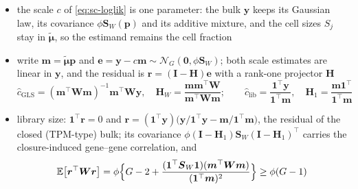 \begin{remark}
  \label{rem:scale-not-closure}
  \begin{itemize}
    \item the scale \(c\) of \eqref{eq:sc-loglik} is one parameter: the bulk \(\boldsymbol{y}\) keeps its Gaussian law, its
          covariance \(\phi\boldsymbol{S}_{W}(\boldsymbol{p})\) and its additive mixture, and the cell sizes \(S_{j}\) stay in
          \(\tilde{\boldsymbol{\mu}}\), so the estimand remains the cell fraction
    \item write \(\boldsymbol{m}=\tilde{\boldsymbol{\mu}}\boldsymbol{p}\) and \(\boldsymbol{e}=\boldsymbol{y}-c\boldsymbol{m}\sim\mathcal{N}_{G}(\boldsymbol{0},\phi\boldsymbol{S}_{W})\);
          both scale estimates are linear in \(\boldsymbol{y}\), and the residual is \(\boldsymbol{r}=(\mathbf{I}-\boldsymbol{H})\boldsymbol{e}\) with
          a rank-one projector \(\boldsymbol{H}\)
          \begin{equation}
            \hat c_{\mathrm{GLS}}=(\boldsymbol{m}^{\top}\boldsymbol{W}\boldsymbol{m})^{-1}\boldsymbol{m}^{\top}\boldsymbol{W}\boldsymbol{y},\quad
            \boldsymbol{H}_{W}=\frac{\boldsymbol{m}\boldsymbol{m}^{\top}\boldsymbol{W}}{\boldsymbol{m}^{\top}\boldsymbol{W}\boldsymbol{m}};
            \qquad
            \hat c_{\mathrm{lib}}=\frac{\mathbf{1}^{\top}\boldsymbol{y}}{\mathbf{1}^{\top}\boldsymbol{m}},\quad
            \boldsymbol{H}_{1}=\frac{\boldsymbol{m}\mathbf{1}^{\top}}{\mathbf{1}^{\top}\boldsymbol{m}}
            \label{eq:scale-projectors}
          \end{equation}
    \item library size: \(\mathbf{1}^{\top}\boldsymbol{r}=0\) and \(\boldsymbol{r}=(\mathbf{1}^{\top}\boldsymbol{y})\bigl(\boldsymbol{y}/\mathbf{1}^{\top}\boldsymbol{y}-
          \boldsymbol{m}/\mathbf{1}^{\top}\boldsymbol{m}\bigr)\), the residual of the closed (TPM-type) bulk; its covariance
          \(\phi(\mathbf{I}-\boldsymbol{H}_{1})\boldsymbol{S}_{W}(\mathbf{I}-\boldsymbol{H}_{1})^{\top}\) carries the closure-induced
          gene--gene correlation, and
          \begin{equation}
            \mathbb{E}\bigl[\boldsymbol{r}^{\top}\boldsymbol{W}\boldsymbol{r}\bigr]
            =\phi\Bigl\{G-2+\frac{(\mathbf{1}^{\top}\boldsymbol{S}_{W}\mathbf{1})(\boldsymbol{m}^{\top}\boldsymbol{W}\boldsymbol{m})}{(\mathbf{1}^{\top}\boldsymbol{m})^{2}}\Bigr\}
            \ge\phi(G-1)
            \label{eq:scale-library-excess}

\end{equation}
\end{itemize}
\end{remark}

